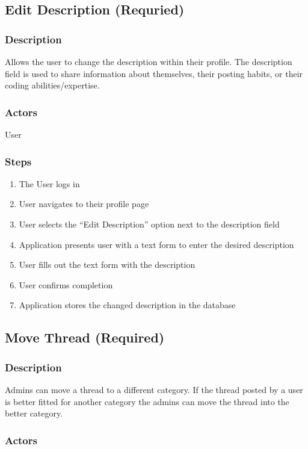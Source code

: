 \documentclass[12pt]{scrartcl}
\begin{document}
\subsection{Edit Description (Requried)}
\subsubsection{Description}
Allows the user to change the description within their profile.
The description field is used to share information about themselves, their posting habits, or their coding abilities/expertise.

\subsubsection {Actors}
User

\subsubsection {Steps}
\begin {enumerate}
\item The User logs in
\item User navigates to their profile page
\item User selects the “Edit Description” option next to the description field
\item Application presents user with a text form to enter the desired description
\item User fills out the text form with the description
\item User confirms completion
\item Application stores the changed description in the database
\end {enumerate}


\subsection{Move Thread (Required)}
\subsubsection{Description}
Admins can move a thread to a different category.
If the thread posted by a user is better fitted for another category the admins can move the thread into the better category. 

\subsubsection{Actors}
\end{document}
